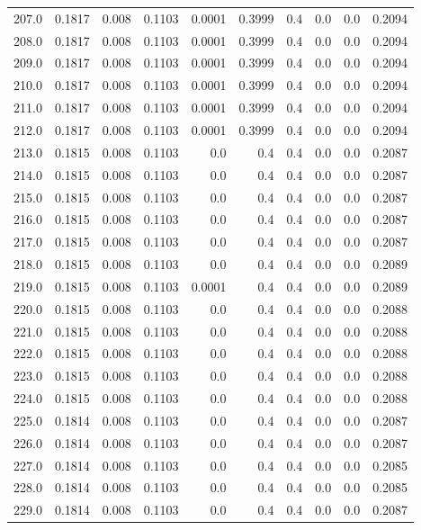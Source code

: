 \begin{longtable}{lrrrrrrrrr}
207.0 & 0.1817 & 0.008 & 0.1103 & 0.0001 & 0.3999 & 0.4 & 0.0 & 0.0 & 0.2094 \\
208.0 & 0.1817 & 0.008 & 0.1103 & 0.0001 & 0.3999 & 0.4 & 0.0 & 0.0 & 0.2094 \\
209.0 & 0.1817 & 0.008 & 0.1103 & 0.0001 & 0.3999 & 0.4 & 0.0 & 0.0 & 0.2094 \\
210.0 & 0.1817 & 0.008 & 0.1103 & 0.0001 & 0.3999 & 0.4 & 0.0 & 0.0 & 0.2094 \\
211.0 & 0.1817 & 0.008 & 0.1103 & 0.0001 & 0.3999 & 0.4 & 0.0 & 0.0 & 0.2094 \\
212.0 & 0.1817 & 0.008 & 0.1103 & 0.0001 & 0.3999 & 0.4 & 0.0 & 0.0 & 0.2094 \\
213.0 & 0.1815 & 0.008 & 0.1103 & 0.0 & 0.4 & 0.4 & 0.0 & 0.0 & 0.2087 \\
214.0 & 0.1815 & 0.008 & 0.1103 & 0.0 & 0.4 & 0.4 & 0.0 & 0.0 & 0.2087 \\
215.0 & 0.1815 & 0.008 & 0.1103 & 0.0 & 0.4 & 0.4 & 0.0 & 0.0 & 0.2087 \\
216.0 & 0.1815 & 0.008 & 0.1103 & 0.0 & 0.4 & 0.4 & 0.0 & 0.0 & 0.2087 \\
217.0 & 0.1815 & 0.008 & 0.1103 & 0.0 & 0.4 & 0.4 & 0.0 & 0.0 & 0.2087 \\
218.0 & 0.1815 & 0.008 & 0.1103 & 0.0 & 0.4 & 0.4 & 0.0 & 0.0 & 0.2089 \\
219.0 & 0.1815 & 0.008 & 0.1103 & 0.0001 & 0.4 & 0.4 & 0.0 & 0.0 & 0.2089 \\
220.0 & 0.1815 & 0.008 & 0.1103 & 0.0 & 0.4 & 0.4 & 0.0 & 0.0 & 0.2088 \\
221.0 & 0.1815 & 0.008 & 0.1103 & 0.0 & 0.4 & 0.4 & 0.0 & 0.0 & 0.2088 \\
222.0 & 0.1815 & 0.008 & 0.1103 & 0.0 & 0.4 & 0.4 & 0.0 & 0.0 & 0.2088 \\
223.0 & 0.1815 & 0.008 & 0.1103 & 0.0 & 0.4 & 0.4 & 0.0 & 0.0 & 0.2088 \\
224.0 & 0.1815 & 0.008 & 0.1103 & 0.0 & 0.4 & 0.4 & 0.0 & 0.0 & 0.2088 \\
225.0 & 0.1814 & 0.008 & 0.1103 & 0.0 & 0.4 & 0.4 & 0.0 & 0.0 & 0.2087 \\
226.0 & 0.1814 & 0.008 & 0.1103 & 0.0 & 0.4 & 0.4 & 0.0 & 0.0 & 0.2087 \\
227.0 & 0.1814 & 0.008 & 0.1103 & 0.0 & 0.4 & 0.4 & 0.0 & 0.0 & 0.2085 \\
228.0 & 0.1814 & 0.008 & 0.1103 & 0.0 & 0.4 & 0.4 & 0.0 & 0.0 & 0.2085 \\
229.0 & 0.1814 & 0.008 & 0.1103 & 0.0 & 0.4 & 0.4 & 0.0 & 0.0 & 0.2087 \\

\end{longtable}
